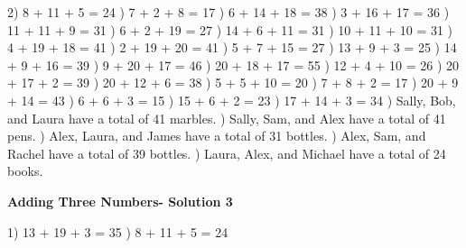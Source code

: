 \documentclass{article}%
\begin{document}
2) 8 + 11 + 5 = 24%
) 7 + 2 + 8 = 17%
) 6 + 14 + 18 = 38%
) 3 + 16 + 17 = 36%
) 11 + 11 + 9 = 31%
) 6 + 2 + 19 = 27%
) 14 + 6 + 11 = 31%
) 10 + 11 + 10 = 31%
) 4 + 19 + 18 = 41%
) 2 + 19 + 20 = 41%
) 5 + 7 + 15 = 27%
) 13 + 9 + 3 = 25%
) 14 + 9 + 16 = 39%
) 9 + 20 + 17 = 46%
) 20 + 18 + 17 = 55%
) 12 + 4 + 10 = 26%
) 20 + 17 + 2 = 39%
) 20 + 12 + 6 = 38%
) 5 + 5 + 10 = 20%
) 7 + 8 + 2 = 17%
) 20 + 9 + 14 = 43%
) 6 + 6 + 3 = 15%
) 15 + 6 + 2 = 23%
) 17 + 14 + 3 = 34%
) Sally, Bob, and Laura have a total of 41 marbles.%
) Sally, Sam, and Alex have a total of 41 pens.%
) Alex, Laura, and James have a total of 31 bottles.%
) Alex, Sam, and Rachel have a total of 39 bottles.%
) Laura, Alex, and Michael have a total of 24 books.%
\newline%
\newpage%
\large%
\begin{center}%
\textbf{Adding Three Numbers- Solution 3}%
\newline%
\end{center} \normalsize%
1) 13 + 19 + 3 = 35%
) 8 + 11 + 5 = 24%
\newline%
\end{document}
